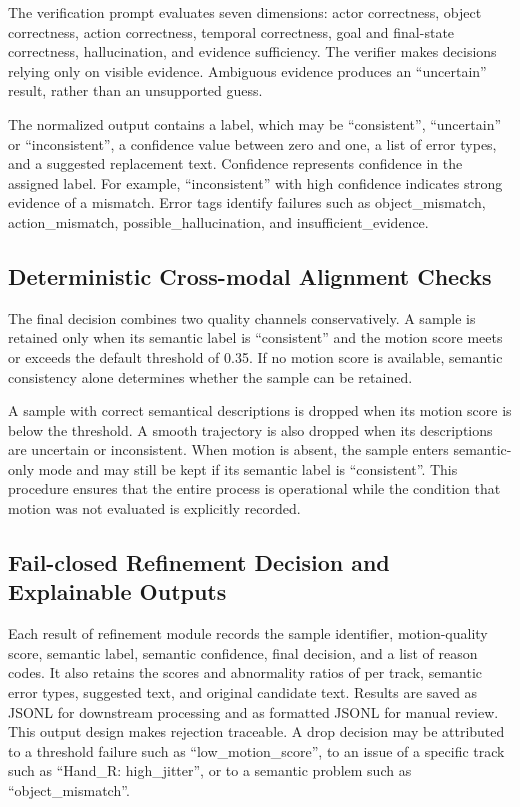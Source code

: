 \documentclass[11pt,oneside]{report}
\begin{document}
The verification prompt evaluates seven dimensions: actor correctness, object correctness, action correctness, temporal correctness, goal and final-state correctness, hallucination, and evidence sufficiency. The verifier makes decisions relying only on visible evidence. Ambiguous evidence produces an “uncertain” result, rather than an unsupported guess.

The normalized output contains a label, which may be “consistent”, “uncertain” or “inconsistent”, a confidence value between zero and one, a list of error types, and a suggested replacement text. Confidence represents confidence in the assigned label. For example, “inconsistent” with high confidence indicates strong evidence of a mismatch. Error tags identify failures such as object\_mismatch, action\_mismatch, possible\_hallucination, and insufficient\_evidence.

\subsection{Deterministic Cross-modal Alignment Checks}

The final decision combines two quality channels conservatively. A sample is retained only when its semantic label is “consistent” and the motion score meets or exceeds the default threshold of 0.35. If no motion score is available, semantic consistency alone determines whether the sample can be retained.

A sample with correct semantical descriptions is dropped when its motion score is below the threshold. A smooth trajectory is also dropped when its descriptions are uncertain or inconsistent. When motion is absent, the sample enters semantic-only mode and may still be kept if its semantic label is “consistent”. This procedure ensures that the entire process is operational while the condition that motion was not evaluated is explicitly recorded.

\subsection{Fail-closed Refinement Decision and Explainable Outputs}

Each result of refinement module records the sample identifier, motion-quality score, semantic label, semantic confidence, final decision, and a list of reason codes. It also retains the scores and abnormality ratios of per track, semantic error types, suggested text, and original candidate text. Results are saved as JSONL for downstream processing and as formatted JSONL for manual review. This output design makes rejection traceable. A drop decision may be attributed to a threshold failure such as “low\_motion\_score”, to an issue of a specific track such as “Hand\_R: high\_jitter”, or to a semantic problem such as “object\_mismatch”.
\end{document}
